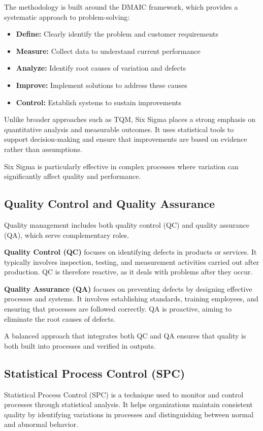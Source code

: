 \documentclass[12pt,a4paper]{article}
\begin{document}
The methodology is built around the DMAIC framework, which provides a systematic approach to problem-solving:
\begin{itemize}
    \item \textbf{Define:} Clearly identify the problem and customer requirements
    \item \textbf{Measure:} Collect data to understand current performance
    \item \textbf{Analyze:} Identify root causes of variation and defects
    \item \textbf{Improve:} Implement solutions to address these causes
    \item \textbf{Control:} Establish systems to sustain improvements
\end{itemize}

Unlike broader approaches such as TQM, Six Sigma places a strong emphasis on quantitative analysis and measurable outcomes. It uses statistical tools to support decision-making and ensure that improvements are based on evidence rather than assumptions.

Six Sigma is particularly effective in complex processes where variation can significantly affect quality and performance.

\subsection*{Quality Control and Quality Assurance}
Quality management includes both quality control (QC) and quality assurance (QA), which serve complementary roles.

\textbf{Quality Control (QC)} focuses on identifying defects in products or services. It typically involves inspection, testing, and measurement activities carried out after production. QC is therefore reactive, as it deals with problems after they occur.

\textbf{Quality Assurance (QA)} focuses on preventing defects by designing effective processes and systems. It involves establishing standards, training employees, and ensuring that processes are followed correctly. QA is proactive, aiming to eliminate the root causes of defects.

A balanced approach that integrates both QC and QA ensures that quality is both built into processes and verified in outputs.

\subsection*{Statistical Process Control (SPC)}
Statistical Process Control (SPC) is a technique used to monitor and control processes through statistical analysis. It helps organizations maintain consistent quality by identifying variations in processes and distinguishing between normal and abnormal behavior.
\end{document}
